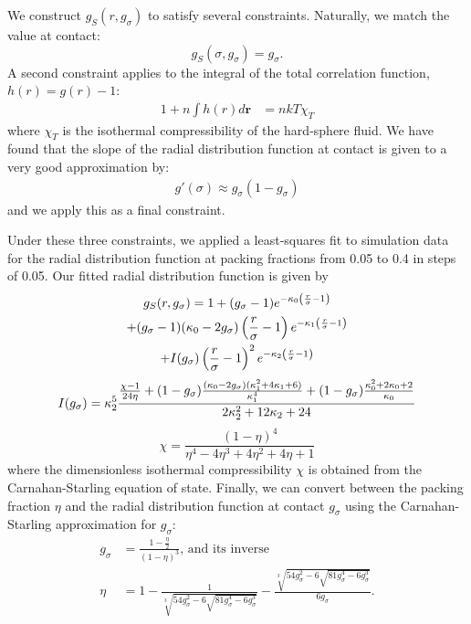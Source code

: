 \documentclass[letterpaper,twocolumn,amsmath,amssymb,pre,aps,10pt]{revtex4-1}
\newcommand{\rr}{\textbf{r}}
\begin{document}
We construct $g_S(r, g_\sigma)$ to satisfy several constraints.
Naturally, we match the value at contact:
\begin{equation}
  g_S(\sigma, g_\sigma) = g_\sigma.
\end{equation}
A second constraint applies to the integral of the total correlation
function, $h(r) = g(r) - 1$:
\begin{align}
  1 + n\int h(r)d\rr &= nkT\chi_T \label{eq:total-constraint}
\end{align}
where $\chi_T$ is the isothermal compressibility of the hard-sphere fluid.
We have found that the slope of the radial distribution function at
contact is given to a very good approximation by:
\begin{align}
  g'(\sigma) \approx g_\sigma (1 - g_\sigma)
\end{align}
and we apply this as a final constraint.\par
Under these three constraints, we applied a least-squares fit to
simulation data for the radial distribution function at packing
fractions from 0.05 to 0.4 in steps of 0.05.  Our fitted radial
distribution function is given by
\begin{multline}
  g_S(r,g_\sigma) = 1 + (g_\sigma-1) e^{-\kappa_0 \left(\frac{r}{\sigma}-1\right)} \\
  + (g_\sigma -1)(\kappa_0 - 2g_\sigma)  \left(\frac{r}{\sigma}-1\right)e^{-\kappa_1  \left(\frac{r}{\sigma}-1\right)} \\
  + I(g_\sigma)  \left(\frac{r}{\sigma}-1\right)^2e^{-\kappa_2  \left(\frac{r}{\sigma}-1\right)}
\end{multline}
\begin{equation}
  I(g_\sigma) = \kappa_2^5 \frac{
    \frac{\chi-1}{24\eta} + (1-g_\sigma) \frac{(\kappa_0-2
      g_\sigma)(\kappa_1^2 + 4 \kappa_1 + 6)}{\kappa_1^4}
    + (1-g_\sigma)\frac{\kappa_0^2 + 2\kappa_0 + 2}{\kappa_0}
  }{2 \kappa_2^2 + 12 \kappa_2 + 24}
\end{equation}
\begin{equation}
  \chi = \frac{(1-\eta)^4}{\eta^4 - 4\eta^3 + 4\eta^2 + 4\eta + 1}
\end{equation}
where the dimensionless isothermal compressibility $\chi$ is obtained
from the Carnahan-Starling equation of state.
Finally, we can convert between the packing fraction $\eta$ and the
radial distribution function at contact $g_\sigma$ using the
Carnahan-Starling approximation for $g_\sigma$:
\newcommand\nastyetacuberoot{\sqrt[3]{54 g_\sigma^2 -
    6\sqrt{81g_\sigma^4 - 6g_\sigma^3}}}
\begin{align}
  g_\sigma &= \frac{1-\tfrac{\eta}{2}}{(1-\eta)^3}\text{, and its inverse} \\
  \eta &= 1 - \frac{1}{\nastyetacuberoot} - \frac{\nastyetacuberoot}{6g_\sigma}.
\end{align}
\end{document}
